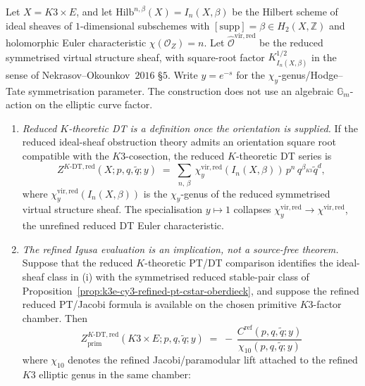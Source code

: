\begin{proposition}
\label{prop:k3e-cy3-ktheoretic-dt-chi10-hodge-tate}
Let $X = K3\times E$, and let
\(\mathrm{Hilb}^{n,\beta}(X)=I_n(X,\beta)\) be the Hilbert scheme of
ideal sheaves of \(1\)-dimensional subschemes with
\([\mathrm{supp}]=\beta\in H_2(X,\mathbb Z)\) and holomorphic Euler
characteristic \(\chi(\mathcal O_Z)=n\). Let
\(\widehat{\mathcal O}^{\mathrm{vir},\mathrm{red}}\) be the reduced
symmetrised virtual structure sheaf, with square-root factor
\(K_{I_n(X,\beta)}^{1/2}\) in the sense of Nekrasov--Okounkov~$2016$
\S$5$. Write \(y=e^{-s}\) for the \(\chi_y\)-genus/Hodge--Tate
symmetrisation parameter. The construction does not use an algebraic
\(\mathbb G_m\)-action on the elliptic curve factor.
\begin{enumerate}[label=\textup{(\roman*)}]
\item \emph{Reduced \(K\)-theoretic DT is a definition once the
orientation is supplied.} If the reduced ideal-sheaf obstruction theory
admits an orientation square root compatible with the \(K3\)-cosection,
the reduced \(K\)-theoretic DT series is
\[
 Z^{K\text{-DT},\mathrm{red}}(X; p, q, \tilde q; y) \;=\; \sum_{n,\,\beta}\,\chi_{y}^{\mathrm{vir,red}}(I_{n}(X,\beta))\,p^{n}\,q^{\beta_{K3}}\tilde q^{d},
\]
where \(\chi_y^{\mathrm{vir,red}}(I_n(X,\beta))\) is the
\(\chi_y\)-genus of the reduced symmetrised virtual structure sheaf.
The specialisation \(y\mapsto1\) collapses
\(\chi_y^{\mathrm{vir,red}}\to\chi^{\mathrm{vir,red}}\), the
unrefined reduced DT Euler characteristic.
\item \emph{The refined Igusa evaluation is an implication, not a
source-free theorem.} Suppose that the reduced \(K\)-theoretic PT/DT
comparison identifies the ideal-sheaf class in \textup{(i)} with the
symmetrised reduced stable-pair class of
Proposition~\ref{prop:k3e-cy3-refined-pt-cstar-oberdieck}, and suppose
the refined reduced PT/Jacobi formula is available on the chosen
primitive \(K3\)-factor chamber. Then
\[
 \boxed{\; Z^{K\text{-DT},\mathrm{red}}_{\mathrm{prim}}(K3\times E; p, q, \tilde q; y) \;=\; -\,\frac{C^{\mathrm{ref}}(p, q, \tilde q; y)}{\chi_{10}(p, q, \tilde q; y)} \;}
\]
where \(\chi_{10}\) denotes the refined Jacobi/paramodular lift attached
to the refined \(K3\) elliptic genus in the same chamber:

\end{enumerate}
\end{proposition}
